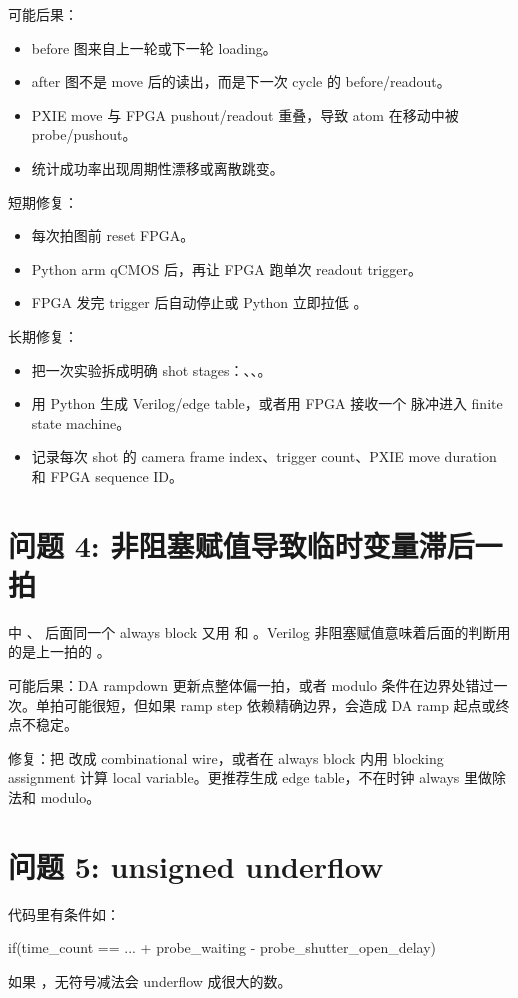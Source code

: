 \documentclass[11pt,oneside,openany]{book}
\begin{document}
可能后果：
\begin{itemize}
  \item before 图来自上一轮或下一轮 loading。
  \item after 图不是 move 后的读出，而是下一次 cycle 的 before/readout。
  \item PXIE move 与 FPGA pushout/readout 重叠，导致 atom 在移动中被 probe/pushout。
  \item 统计成功率出现周期性漂移或离散跳变。
\end{itemize}

短期修复：
\begin{itemize}
  \item 每次拍图前  reset FPGA。
  \item Python arm qCMOS 后，再让 FPGA 跑单次 readout trigger。
  \item FPGA 发完 trigger 后自动停止或 Python 立即拉低 。
\end{itemize}

长期修复：
\begin{itemize}
  \item 把一次实验拆成明确 shot stages：、、。
  \item 用 Python 生成 Verilog/edge table，或者用 FPGA 接收一个  脉冲进入 finite state machine。
  \item 记录每次 shot 的 camera frame index、trigger count、PXIE move duration 和 FPGA sequence ID。
\end{itemize}

\section{问题 4: 非阻塞赋值导致临时变量滞后一拍}
 中 、 后面同一个 always block 又用  和 。Verilog 非阻塞赋值意味着后面的判断用的是上一拍的 。

可能后果：DA rampdown 更新点整体偏一拍，或者 modulo 条件在边界处错过一次。单拍可能很短，但如果 ramp step 依赖精确边界，会造成 DA ramp 起点或终点不稳定。

修复：把  改成 combinational wire，或者在 always block 内用 blocking assignment 计算 local variable。更推荐生成 edge table，不在时钟 always 里做除法和 modulo。

\section{问题 5: unsigned underflow}
代码里有条件如：
\begin{codeblock}[Verilog]
if(time_count == ... + probe_waiting - probe_shutter_open_delay)
\end{codeblock}
如果 ，无符号减法会 underflow 成很大的数。
\end{document}
